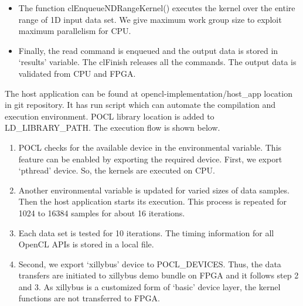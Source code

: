 \begin{itemize}
	
	\item The function clEnqueueNDRangeKernel() executes the kernel over the entire range of 1D input data set. We give maximum work group size to exploit maximum parallelism for CPU. 
	
	\item Finally, the read command is enqueued and the output data is stored in ‘results’ variable. The clFinish releases all the commands. The output data is validated from CPU and FPGA. 
\end{itemize}

The host application can be found at opencl-implementation/host\_app location in git repository. It has run script which can automate the compilation and execution environment. POCL library location is added to LD\_LIBRARY\_PATH. The execution flow is shown below.
\begin{enumerate}
	\item POCL checks for the available device in the environmental variable. This feature can be enabled by exporting the required device. First, we export ‘pthread’ device. So, the kernels are executed on CPU.
	\item Another environmental variable is updated for varied sizes of data samples. Then the host application starts its execution. This process is repeated for 1024 to 16384 samples for about 16 iterations. 
	\item Each data set is tested for 10 iterations. The timing information for all OpenCL APIs is stored in a local file.
	\item Second, we export ‘xillybus’ device to POCL\_DEVICES. Thus, the data transfers are initiated to xillybus demo bundle on FPGA and it follows step 2 and 3. As xillybus is a customized form of ‘basic’ device layer, the kernel functions are not transferred to FPGA. 
\end{enumerate}

